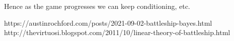 \documentclass[11pt]{article}
\newtheorem{definition}{Definition}
\begin{document}
Hence as the game progresses we can keep conditioning, etc. 
%
%
%
%
%
%


%

\begin{thebibliography}{11}

 https://austinrochford.com/posts/2021-09-02-battleship-bayes.html
 http://thevirtuosi.blogspot.com/2011/10/linear-theory-of-battleship.html
\end{thebibliography}
\end{document}
